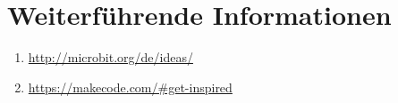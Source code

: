 \documentclass{hmLab}
\begin{document}
\section*{Weiterführende Informationen}

\begin{enumerate}[label=$\bullet$]
	\item \href{http://microbit.org/de/ideas/}{http://microbit.org/de/ideas/}
	\item \href{https://makecode.com/\#get-inspired}{https://makecode.com/\#get-inspired}
\end{enumerate}
\end{document}
